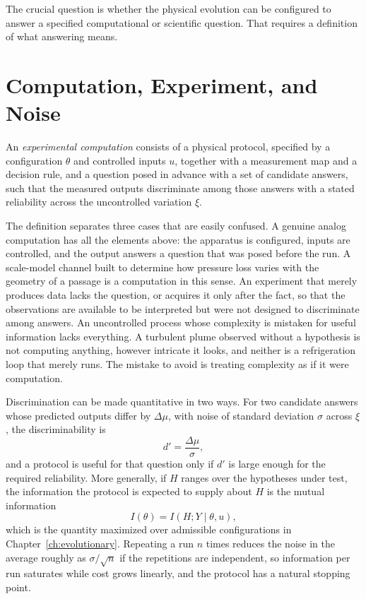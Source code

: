 The crucial question is whether the physical evolution can be configured to answer a specified computational or scientific question. That requires a definition of what answering means.

\section{Computation, Experiment, and Noise}

\begin{definition}
\label{def:expcomp}
An \emph{experimental computation} consists of a physical protocol, specified by a configuration $\theta$ and controlled inputs $u$, together with a measurement map and a decision rule, and a question posed in advance with a set of candidate answers, such that the measured outputs discriminate among those answers with a stated reliability across the uncontrolled variation $\xi$.
\end{definition}

The definition separates three cases that are easily confused. A genuine analog computation has all the elements above: the apparatus is configured, inputs are controlled, and the output answers a question that was posed before the run. A scale-model channel built to determine how pressure loss varies with the geometry of a passage is a computation in this sense. An experiment that merely produces data lacks the question, or acquires it only after the fact, so that the observations are available to be interpreted but were not designed to discriminate among answers. An uncontrolled process whose complexity is mistaken for useful information lacks everything. A turbulent plume observed without a hypothesis is not computing anything, however intricate it looks, and neither is a refrigeration loop that merely runs. The mistake to avoid is treating complexity as if it were computation.

Discrimination can be made quantitative in two ways. For two candidate answers whose predicted outputs differ by $\Delta\mu$, with noise of standard deviation $\sigma$ across $\xi$, the discriminability is
\[
d'=\frac{\Delta\mu}{\sigma},
\]
and a protocol is useful for that question only if $d'$ is large enough for the required reliability. More generally, if $H$ ranges over the hypotheses under test, the information the protocol is expected to supply about $H$ is the mutual information
\[
I(\theta)=I(H;Y\mid\theta,u),
\]
which is the quantity maximized over admissible configurations in Chapter~\ref{ch:evolutionary}. Repeating a run $n$ times reduces the noise in the average roughly as $\sigma/\sqrt{n}$ if the repetitions are independent, so information per run saturates while cost grows linearly, and the protocol has a natural stopping point.

